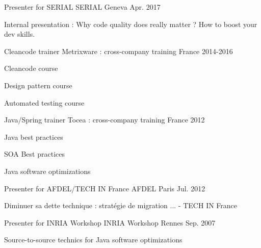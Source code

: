\begin{cventries}
\cventry
{Presenter for SERIAL} %
{SERIAL} %
{Geneva} %
{Apr. 2017} %
{
    \begin{cvitems} %
        \item {Internal presentation : Why code quality does really matter ? How to boost your dev skills.}
    \end{cvitems}
}
\cventry
{Cleancode trainer} %
{Metrixware : cross-company training} %
{France} %
{2014-2016} %
{
    \begin{cvitems} %
        \item {Cleancode course}
        \item {Design pattern course}
        \item {Automated testing course}
    \end{cvitems}
} 
\cventry
{Java/Spring trainer} %
{Tocea : cross-company training} %
{France} %
{2012} %
{
    \begin{cvitems} %
        \item {Java best practices}
        \item {SOA Best practices}
        \item {Java software optimizations}
    \end{cvitems}
}
  \cventry
    {Presenter for AFDEL/TECH IN France} %
    {AFDEL} %
    {Paris} %
    {Jul. 2012} %
    {
      \begin{cvitems} %
        \item {Diminuer sa dette technique : stratégie de migration ... - TECH IN France}
      \end{cvitems}
    }

  \cventry
    {Presenter for INRIA Workshop} %
    {INRIA Workshop} %
    {Rennes} %
    {Sep. 2007} %
    {
      \begin{cvitems} %
        \item {Source-to-source technics for Java software optimizations}
      \end{cvitems}
    }

\end{cventries}


